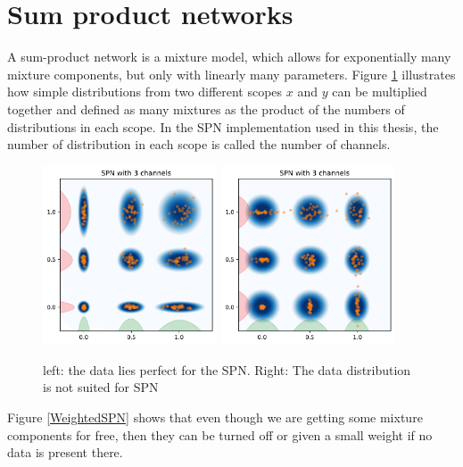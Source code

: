 \section{Sum product networks}
A sum-product network is a mixture model, which allows for exponentially many mixture components, 
but only with linearly many parameters. Figure \ref{SPN_fig} illustrates how
simple distributions from two different scopes $x$ and $y$ can be multiplied
together and defined as many mixtures as the product of the numbers of 
distributions in each scope. In the SPN implementation used in this thesis, 
the number of distribution in each scope is called the number of channels.  

\begin{figure}[H]%
    \centering
    {\includegraphics[width=0.46\textwidth]{Pictures/SPN_illustration1.pdf} }%
    \qquad
   {\includegraphics[width=0.46\textwidth]{Pictures/SPN_illustration2.pdf} }%
    \caption{left: the data lies perfect for the SPN. Right: The data distribution
    is not suited for SPN}%
    \label{SPN_fig}%
\end{figure}

Figure \ref{WeightedSPN} shows that even though we are getting some
mixture components for free, then they can be turned off or given a small weight
if no data is present there. 

